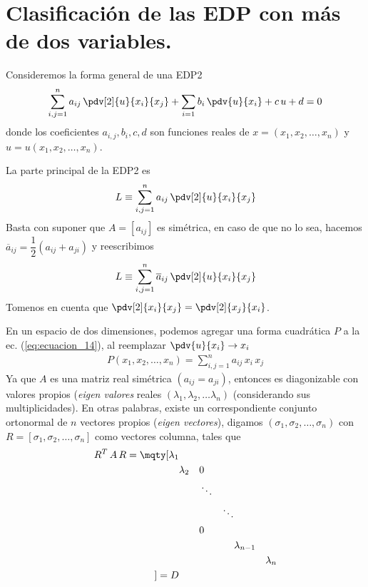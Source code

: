 \section{Clasificación de las EDP con más de dos variables.}
Consideremos la forma general de una EDP2
\begin{align}
\sum_{i,j=1}^{n} a_{ij} \, \pdv[2]{u}{x_{i}}{x_{j}} + \sum_{i=1} b_{i} \, \pdv{u}{x_{i}} + c \, u + d = 0
\label{eq:ecuacion_12}    
\end{align}
donde los coeficientes $a_{i,j}, b_{i}, c, d$ son funciones reales de $x = (x_{1}, x_{2}, \ldots, x_{n})$ y $u = u(x_{1}, x_{2}, \ldots, x_{n})$.
\par
La parte principal de la EDP2 es
\begin{align}
L \equiv \sum_{i, j=1}^{n} a_{ij} \, \pdv[2]{u}{x_{i}}{x_{j}}
\label{eq:ecuacion_13}    
\end{align}
Basta con suponer que $A = [a_{ij}]$ es simétrica, en caso de que no  lo sea, hacemos $\overline{a}_{ij} = \dfrac{1}{2} (a_{ij} + a_{ji})$ y reescribimos
\begin{align}
L \equiv \sum_{i, j=1}^{n} \overline{a}_{ij} \, \pdv[2]{u}{x_{i}}{x_{j}}
\label{eq:ecuacion_14}    
\end{align}
Tomenos en cuenta que $\displaystyle \pdv[2]{x_{i}}{x_{j}} = \pdv[2]{x_{j}}{x_{i}}$. 
\par
En un espacio de dos dimensiones, podemos agregar una forma cuadrática $P$ a la ec. (\ref{eq:ecuacion_14}), al reemplazar $\displaystyle \pdv{u}{x_{i}} \to x_{i}$
\begin{align}
P(x_{1}, x_{2},\ldots, x_{n}) = \sum_{i,j=1}^{n} a_{ij} \, x_{i} \, x_{j}
\label{eq:ecuacion_0150}
\end{align}
Ya que $A$ es una matriz real simétrica $(a_{ij} = a_{ji})$, entonces es diagonizable con valores propios (\emph{eigen valores} reales $(\lambda_{1}, \lambda_{2}, \ldots \lambda_{n})$ (considerando sus multiplicidades). En otras palabras, existe un correspondiente conjunto ortonormal de $n$ vectores propios (\emph{eigen vectores}), digamos $(\sigma_{1}, \sigma_{2}, \ldots, \sigma_{n})$ con $R = [\sigma_{1}, \sigma_{2}, \ldots, \sigma_{n}]$ como vectores columna, tales que
\begin{align}
R^{T} \, A \, R =
\mqty[
\lambda_{1} & & & & & & \\
& \lambda_{2} & & 0 & & & \\
& & & \ddots & &  & \\
& & & &\ddots & & \\
& & & 0 & & & \\
&  & &  & & \lambda_{n-1} & \\
&  & &  & & & \lambda_{n} \\
] = D
\label{eq:ecuacion_16}    
\end{align}
